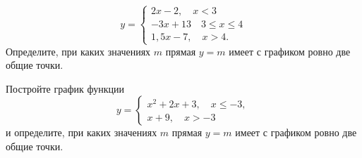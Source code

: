 \begin{consultation}
\begin{listofex}
		\[y=	 \left\{
		\begin{array}{l}
			2x-2, \quad x<3\\
			-3x+13 \quad 3\leq x\leq4\\
			1,5x-7, \quad x>4.
		\end{array}
		\right. \]
		Определите, при каких значениях \( m \) прямая \( y=m \) имеет с графиком ровно две общие точки.
		\item Постройте график функции
		\[y=	 \left\{
		\begin{array}{l}
			x^2+2x+3, \quad x\leq-3,\\
			x+9, \quad x>-3
		\end{array}
		\right. \]
		и определите, при каких значениях \( m \) прямая \( y=m \) имеет с графиком ровно две общие точки.
	\end{listofex}
\end{consultation}
